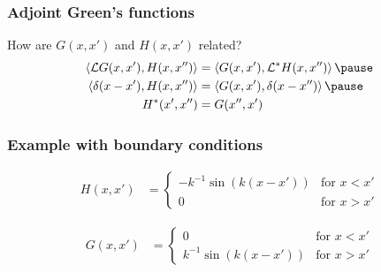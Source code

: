 \documentclass[12 pt, compress, handout, intlimits]{beamer}
\renewcommand{\L}{\mathcal{L}}
\newcommand{\inprod}[2]{\left\langle {#1}, {#2} \right\rangle}
\newcommand*\widefbox[1]{\fbox{\hspace{1em}#1\hspace{1em}}}
\renewcommand{\L}{\mathcal{L}}
\begin{document}

\begin{frame}[fragile]
    \frametitle{Adjoint Green's functions}

    How are $ G(x,x') $ and $ H(x,x') $ related?
    \begin{align*}
        \inprod{\L G(x,x')}{H(x,x'')} &= \inprod{G(x,x')}{\L^* H(x,x'')}
        \pause
        \\
        \inprod{\delta(x - x')}{H(x,x'')} &= \inprod{G(x,x')}{\delta(x - x'')}
        \pause
        \\
        H^*(x',x'') &= G(x'',x')
    \end{align*}
        \pause
    
\end{frame}


\begin{frame}[fragile]
    \frametitle{Example with boundary conditions}
     
    \begin{align*}
        H(x,x') &= 
            \begin{cases} 
                - k^{-1} \sin(k (x - x')) & \text{for } x < x'
                \\
                0 & \text{for } x > x'
            \end{cases} 
    \end{align*}

    \begin{align*}
        G(x,x') &= 
            \begin{cases} 
                0 & \text{for } x < x'
                \\
                k^{-1} \sin(k (x - x')) & \text{for } x > x'
            \end{cases} 
    \end{align*}

\end{frame}
\end{document}
